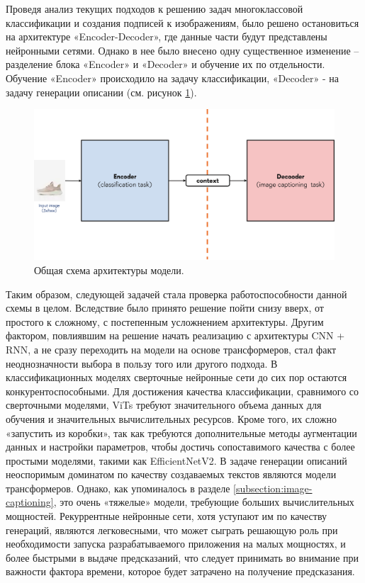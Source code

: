 \documentclass[a4paper,12pt]{extarticle}
\begin{document}
Проведя анализ текущих подходов к решению задач многоклассовой классификации и создания подписей к изображениям, было решено остановиться на архитектуре «Encoder-Decoder», где данные части будут представлены нейронными сетями. Однако в нее было внесено одну существенное изменение – разделение блока «Encoder» и «Decoder» и обучение их по отдельности. Обучение «Encoder» происходило на задачу классификации, «Decoder» - на задачу генерации описании (см. рисунок \ref{fig:general_encoderdecoder_scheme}).

\begin{figure}[ht]
	\centering
	\includegraphics[scale=0.5]{general_encoderdecoder_scheme.png}
	\caption{Общая схема архитектуры модели.}
	\label{fig:general_encoderdecoder_scheme}
\end{figure}

Таким образом, следующей задачей стала проверка работоспособности данной схемы в целом. Вследствие было принято решение пойти снизу вверх, от простого к сложному, с постепенным усложнением архитектуры. Другим фактором, повлиявшим на решение начать реализацию с архитектуры CNN + RNN, а не сразу переходить на модели на основе трансформеров, стал факт неоднозначности выбора в пользу того или другого подхода. В классификационных моделях сверточные нейронные сети до сих пор остаются конкурентоспособными. Для достижения качества классификации, сравнимого со сверточными моделями, ViTs требуют значительного объема данных для обучения и значительных вычислительных ресурсов. Кроме того, их сложно «запустить из коробки», так как требуются дополнительные методы аугментации данных и настройки параметров, чтобы достичь сопоставимого качества с более простыми моделями, такими как EfficientNetV2. В задаче генерации описаний неоспоримым доминатом по качеству создаваемых текстов являются модели трансформеров. Однако, как упоминалось в разделе \ref{subsection:image-captioning}, это очень «тяжелые» модели, требующие больших вычислительных мощностей. Рекуррентные нейронные сети, хотя уступают им по качеству генераций, являются легковесными, что может сыграть решающую роль при необходимости запуска разрабатываемого приложения на малых мощностях, и более быстрыми в выдаче предсказаний, что следует принимать во внимание при важности фактора времени, которое будет затрачено на получение предсказания.
\end{document}
